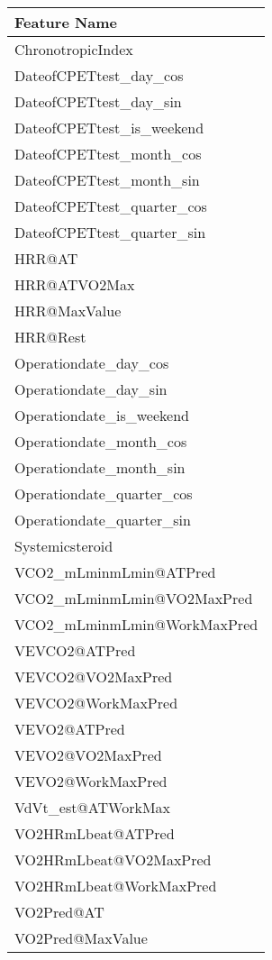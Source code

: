 \documentclass{article}
\begin{document}
\begin{table}[ht]  %
    \centering
    \begin{tabular}{|l|}
    \hline
    \textbf{Feature Name} \\
    \hline
    ChronotropicIndex \\
    DateofCPETtest\_day\_cos \\
    DateofCPETtest\_day\_sin \\
    DateofCPETtest\_is\_weekend \\
    DateofCPETtest\_month\_cos \\
    DateofCPETtest\_month\_sin \\
    DateofCPETtest\_quarter\_cos \\
    DateofCPETtest\_quarter\_sin \\
    HRR@AT \\
    HRR@ATVO2Max \\
    HRR@MaxValue \\
    HRR@Rest \\
    Operationdate\_day\_cos \\
    Operationdate\_day\_sin \\
    Operationdate\_is\_weekend \\
    Operationdate\_month\_cos \\
    Operationdate\_month\_sin \\
    Operationdate\_quarter\_cos \\
    Operationdate\_quarter\_sin \\
    Systemicsteroid \\
    VCO2\_mLminmLmin@ATPred \\
    VCO2\_mLminmLmin@VO2MaxPred \\
    VCO2\_mLminmLmin@WorkMaxPred \\
    VEVCO2@ATPred \\
    VEVCO2@VO2MaxPred \\
    VEVCO2@WorkMaxPred \\
    VEVO2@ATPred \\
    VEVO2@VO2MaxPred \\
    VEVO2@WorkMaxPred \\
    VdVt\_est@ATWorkMax \\
    VO2HRmLbeat@ATPred \\
    VO2HRmLbeat@VO2MaxPred \\
    VO2HRmLbeat@WorkMaxPred \\
    VO2Pred@AT \\
    VO2Pred@MaxValue \\

\end{tabular}
\end{table}
\end{document}
